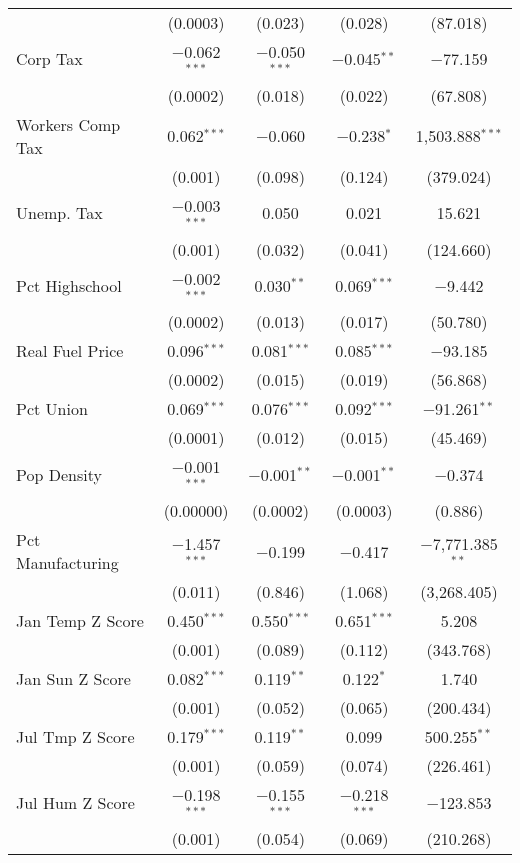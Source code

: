 \begin{table}[!htbp]
\begin{tabular}{@{\extracolsep{5pt}}lcccc}
  & (0.0003) & (0.023) & (0.028) & (87.018) \\ 
  Corp Tax & $-$0.062$^{***}$ & $-$0.050$^{***}$ & $-$0.045$^{**}$ & $-$77.159 \\ 
  & (0.0002) & (0.018) & (0.022) & (67.808) \\ 
  Workers Comp Tax & 0.062$^{***}$ & $-$0.060 & $-$0.238$^{*}$ & 1,503.888$^{***}$ \\ 
  & (0.001) & (0.098) & (0.124) & (379.024) \\ 
  Unemp. Tax & $-$0.003$^{***}$ & 0.050 & 0.021 & 15.621 \\ 
  & (0.001) & (0.032) & (0.041) & (124.660) \\ 
  Pct Highschool & $-$0.002$^{***}$ & 0.030$^{**}$ & 0.069$^{***}$ & $-$9.442 \\ 
  & (0.0002) & (0.013) & (0.017) & (50.780) \\ 
  Real Fuel Price & 0.096$^{***}$ & 0.081$^{***}$ & 0.085$^{***}$ & $-$93.185 \\ 
  & (0.0002) & (0.015) & (0.019) & (56.868) \\ 
  Pct Union & 0.069$^{***}$ & 0.076$^{***}$ & 0.092$^{***}$ & $-$91.261$^{**}$ \\ 
  & (0.0001) & (0.012) & (0.015) & (45.469) \\ 
  Pop Density & $-$0.001$^{***}$ & $-$0.001$^{**}$ & $-$0.001$^{**}$ & $-$0.374 \\ 
  & (0.00000) & (0.0002) & (0.0003) & (0.886) \\ 
  Pct Manufacturing & $-$1.457$^{***}$ & $-$0.199 & $-$0.417 & $-$7,771.385$^{**}$ \\ 
  & (0.011) & (0.846) & (1.068) & (3,268.405) \\ 
  Jan Temp Z Score & 0.450$^{***}$ & 0.550$^{***}$ & 0.651$^{***}$ & 5.208 \\ 
  & (0.001) & (0.089) & (0.112) & (343.768) \\ 
  Jan Sun Z Score & 0.082$^{***}$ & 0.119$^{**}$ & 0.122$^{*}$ & 1.740 \\ 
  & (0.001) & (0.052) & (0.065) & (200.434) \\ 
  Jul Tmp Z Score & 0.179$^{***}$ & 0.119$^{**}$ & 0.099 & 500.255$^{**}$ \\ 
  & (0.001) & (0.059) & (0.074) & (226.461) \\ 
  Jul Hum Z Score & $-$0.198$^{***}$ & $-$0.155$^{***}$ & $-$0.218$^{***}$ & $-$123.853 \\ 
  & (0.001) & (0.054) & (0.069) & (210.268) \\ 

\end{tabular}
\end{table}
